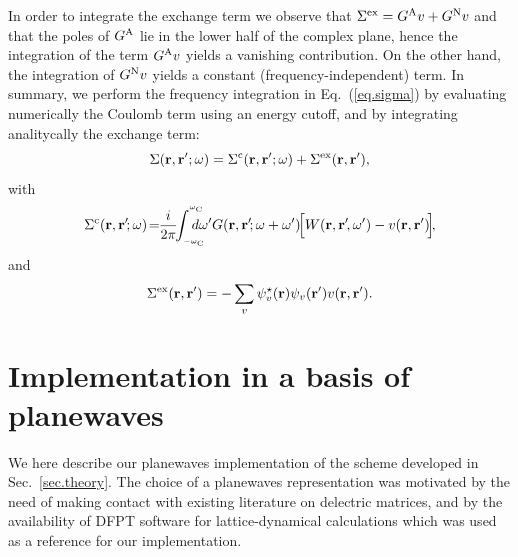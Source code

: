 \documentclass[twocolumn,prb,showpacs,superscriptaddress]{revtex4}
\def\w{\omega}
\def\wp{\omega^\prime}
\def\wc{{\omega_{\rm C}}}
\def\r{{\bf r}}
\def\rp{{\bf r^\prime}}
\begin{document}
In order to integrate the exchange term we observe that 
$\Sigma^{\rm ex}=G^{\rm A}v + G^{\rm N}v$
and that the poles of $G^{\rm A}$ lie in the lower half of the complex plane,
hence the integration of the term $G^{\rm A}v$ yields a vanishing contribution.
On the other hand, the integration of $G^{\rm N}v$ yields a constant (frequency-independent) term.\cite{note.integral}
In summary, we perform the frequency integration in Eq.\ (\ref{eq.sigma}) 
by evaluating numerically
the Coulomb term using an energy cutoff, and by integrating analitycally the exchange term:
  \begin{equation}
  \Sigma(\r,\rp;\w) = \Sigma^{\rm c}(\r,\rp;\w) + \Sigma^{\rm ex}(\r,\rp),
  \end{equation}
with
  \begin{equation}\label{eq.convolution}
 \Sigma^{\rm c}(\r,\rp\!;\w) \! = \!\! \frac{i}{2\pi} \!\!\int_{_{-\wc}}^{^\wc} \!\!\!\!\!\!\!d\wp 
 G(\r,\rp\!;\w+\wp) \!\Big[W(\r,\rp\!,\wp)-v(\r,\rp)\!\Big]\!,
  \end{equation}
and
  \begin{equation}
  \Sigma^{\rm ex}(\r,\rp) = - \sum_v \psi_v^\star(\r)\psi_v(\rp) v(\r,\rp).
  \end{equation}


\section{Implementation in a basis of planewaves}\label{sec.theory.g}

We here describe our planewaves implementation of the scheme 
developed in Sec.\ \ref{sec.theory}. The choice of a planewaves representation
was motivated by the need of making contact with existing literature on delectric
matrices,\cite{cpm,hl86-prb,balde_tosa,baroni-resta} 
and by the availability of DFPT software for lattice-dynamical
calculations\cite{espresso} which was used as a reference for our implementation.
\end{document}
